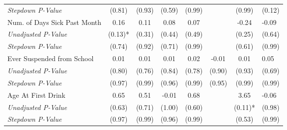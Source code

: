 \begin{tabular}{l c c c c c c}
\quad \textit{Stepdown P-Value} & (0.81) & (0.93) & (0.59) & (0.99) & & (0.99) & (0.12) \\
Num. of Days Sick Past Month & 0.16 & 0.11 & 0.08 & 0.07 & & -0.24 & -0.09 \\
\quad \textit{Unadjusted P-Value} & (0.13)* & (0.31) & (0.44) & (0.49) & & (0.25) & (0.64) \\
\quad \textit{Stepdown P-Value} & (0.74) & (0.92) & (0.71) & (0.99) & & (0.61) & (0.99) \\
Ever Suspended from School & 0.01 & 0.01 & 0.01 & 0.02 & -0.01 & 0.01 & 0.05 \\
\quad \textit{Unadjusted P-Value} & (0.80) & (0.76) & (0.84) & (0.78) & (0.90) & (0.93) & (0.69) \\
\quad \textit{Stepdown P-Value} & (0.97) & (0.99) & (0.96) & (0.99) & (0.95) & (0.99) & (0.99) \\
Age At First Drink & 0.65 & 0.51 & -0.01 & 0.68 & & 3.65 & -0.06 \\
\quad \textit{Unadjusted P-Value} & (0.63) & (0.71) & (1.00) & (0.60) & & (0.11)* & (0.98) \\
\quad \textit{Stepdown P-Value} & (0.97) & (0.99) & (0.96) & (0.99) & & (0.53) & (0.99) \\
\bottomrule
\end{tabular}
